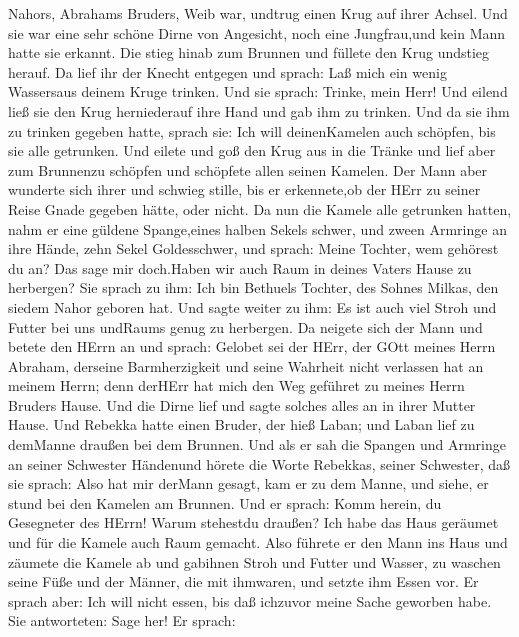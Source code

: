 Nahors, Abrahams Bruders, Weib war, undtrug einen Krug auf ihrer Achsel.
 Und sie war eine sehr schöne Dirne von Angesicht, noch
eine Jungfrau,und kein Mann hatte sie erkannt. Die stieg hinab zum
Brunnen und füllete den Krug undstieg herauf.  Da lief ihr
der Knecht entgegen und sprach: Laß mich ein wenig Wassersaus deinem
Kruge trinken.  Und sie sprach: Trinke, mein Herr! Und
eilend ließ sie den Krug herniederauf ihre Hand und gab ihm zu trinken.
 Und da sie ihm zu trinken gegeben hatte, sprach sie: Ich
will deinenKamelen auch schöpfen, bis sie alle getrunken. 
Und eilete und goß den Krug aus in die Tränke und lief aber zum
Brunnenzu schöpfen und schöpfete allen seinen Kamelen.  Der
Mann aber wunderte sich ihrer und schwieg stille, bis er erkennete,ob
der HErr zu seiner Reise Gnade gegeben hätte, oder nicht. 
Da nun die Kamele alle getrunken hatten, nahm er eine güldene
Spange,eines halben Sekels schwer, und zween Armringe an ihre Hände,
zehn Sekel Goldesschwer,  und sprach: Meine Tochter, wem
gehörest du an? Das sage mir doch.Haben wir auch Raum in deines Vaters
Hause zu herbergen?  Sie sprach zu ihm: Ich bin Bethuels
Tochter, des Sohnes Milkas, den siedem Nahor geboren hat. 
Und sagte weiter zu ihm: Es ist auch viel Stroh und Futter bei uns
undRaums genug zu herbergen.  Da neigete sich der Mann und
betete den HErrn an  und sprach: Gelobet sei der HErr, der
GOtt meines Herrn Abraham, derseine Barmherzigkeit und seine Wahrheit
nicht verlassen hat an meinem Herrn; denn derHErr hat mich den Weg
geführet zu meines Herrn Bruders Hause.  Und die Dirne lief
und sagte solches alles an in ihrer Mutter Hause.  Und
Rebekka hatte einen Bruder, der hieß Laban; und Laban lief zu demManne
draußen bei dem Brunnen.  Und als er sah die Spangen und
Armringe an seiner Schwester Händenund hörete die Worte Rebekkas, seiner
Schwester, daß sie sprach: Also hat mir derMann gesagt, kam er zu dem
Manne, und siehe, er stund bei den Kamelen am Brunnen.  Und
er sprach: Komm herein, du Gesegneter des HErrn! Warum stehestdu
draußen? Ich habe das Haus geräumet und für die Kamele auch Raum
gemacht.  Also führete er den Mann ins Haus und zäumete die
Kamele ab und gabihnen Stroh und Futter und Wasser, zu waschen seine
Füße und der Männer, die mit ihmwaren,  und setzte ihm
Essen vor. Er sprach aber: Ich will nicht essen, bis daß ichzuvor meine
Sache geworben habe. Sie antworteten: Sage her!  Er sprach:
